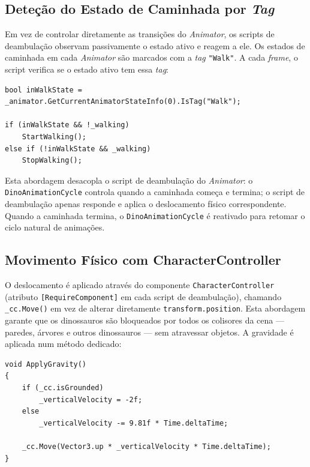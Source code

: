\documentclass[a4paper,11pt]{report}
\newcommand{\code}[1]{\texttt{#1}}
\begin{document}
\subsection{Deteção do Estado de Caminhada por \textit{Tag}}

Em vez de controlar diretamente as transições do \textit{Animator}, os scripts
de deambulação observam passivamente o estado ativo e reagem a ele. Os estados de
caminhada em cada \textit{Animator} são marcados com a \textit{tag} \code{"Walk"}.
A cada \textit{frame}, o script verifica se o estado ativo tem essa \textit{tag}:

\begin{lstlisting}[caption={Deteção de estado de caminhada por tag (RaptorWander.cs).},
                   label={lst:wandertag}]
bool inWalkState = _animator.GetCurrentAnimatorStateInfo(0).IsTag("Walk");

if (inWalkState && !_walking)
    StartWalking();
else if (!inWalkState && _walking)
    StopWalking();
\end{lstlisting}

Esta abordagem desacopla o script de deambulação do \textit{Animator}: o
\code{DinoAnimationCycle} controla quando a caminhada começa e termina; o script
de deambulação apenas responde e aplica o deslocamento físico correspondente.
Quando a caminhada termina, o \code{DinoAnimationCycle} é reativado para retomar
o ciclo natural de animações.

\subsection{Movimento Físico com CharacterController}

O deslocamento é aplicado através do componente \code{CharacterController}
(atributo \code{[RequireComponent]} em cada script de deambulação), chamando
\code{\_cc.Move()} em vez de alterar diretamente \code{transform.position}.
Esta abordagem garante que os dinossauros são bloqueados por todos os colisores
da cena --- paredes, árvores e outros dinossauros --- sem atravessar objetos.
A gravidade é aplicada num método dedicado:

\begin{lstlisting}[caption={Gravidade aplicada via CharacterController (RaptorWander.cs).},
                   label={lst:wandergrav}]
void ApplyGravity()
{
    if (_cc.isGrounded)
        _verticalVelocity = -2f;
    else
        _verticalVelocity -= 9.81f * Time.deltaTime;

    _cc.Move(Vector3.up * _verticalVelocity * Time.deltaTime);
}
\end{lstlisting}
\end{document}
